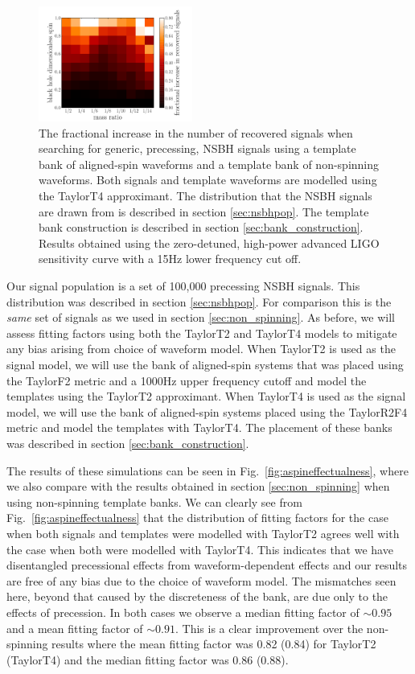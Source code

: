 \begin{figure}
\includegraphics[width=0.45\textwidth]
{papers/nsbh_effectualness/figure15.pdf}
\caption{\label{fig:aspinimpr}
The fractional increase in the number of recovered signals when
searching for generic, precessing, NSBH signals using
a template bank of aligned-spin waveforms and a template bank of non-spinning
waveforms. Both signals and template waveforms are modelled using the TaylorT4
approximant. The distribution that the NSBH
signals are drawn from is described in section \ref{sec:nsbhpop}. The
template bank construction is described in section \ref{sec:bank_construction}.
Results obtained
using the zero-detuned, high-power advanced LIGO sensitivity curve with a 15Hz
lower frequency cut off.
}
\end{figure}

Our signal population is a set of 100,000 precessing \ac{NSBH} signals. This 
distribution was
described in section \ref{sec:nsbhpop}. For comparison this is the
\emph{same} set of signals as we used in section \ref{sec:non_spinning}.
As before, we will assess fitting factors using both the TaylorT2 and TaylorT4
models to mitigate any bias arising from choice of waveform model.
When TaylorT2 is used as the signal model, we will use the bank of aligned-spin
systems that was placed using the TaylorF2 metric and a 1000Hz
upper frequency cutoff and model the templates using the TaylorT2 approximant.
When TaylorT4 is used as the signal model, we will use the bank of aligned-spin
systems placed using the TaylorR2F4 metric and model the templates with
TaylorT4. The placement of these banks was described in section
\ref{sec:bank_construction}.

The results of these simulations can be seen in 
Fig.~\ref{fig:aspineffectualness}, where we also compare with the
results obtained in section \ref{sec:non_spinning} when using non-spinning
template banks. We can clearly see from Fig.~\ref{fig:aspineffectualness} that
the distribution of fitting factors for the
case when both signals and templates were modelled with TaylorT2 agrees well
with the case when both were modelled with TaylorT4. This indicates that
we have disentangled precessional effects from waveform-dependent effects and
our results are free of any bias due to the choice of waveform model.
The mismatches seen here, beyond that caused by the discreteness of the bank,
are due only to the effects of precession.
In both cases we observe a median fitting factor of
$\sim 0.95$ and a mean fitting factor of $\sim 0.91$. This is a clear
improvement
over the non-spinning results where the mean fitting factor was 0.82 (0.84) for
TaylorT2 (TaylorT4) and the median
fitting factor was 0.86 (0.88). 


